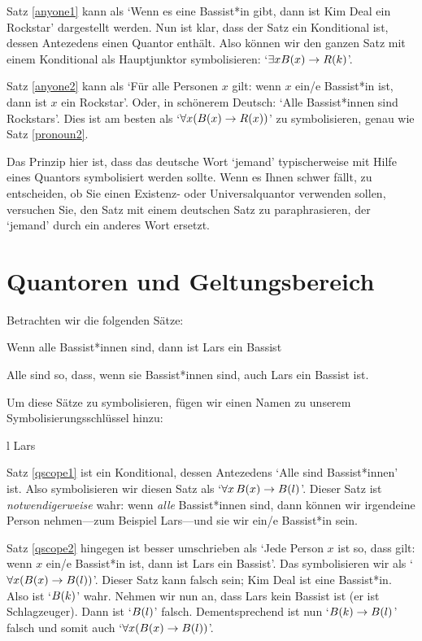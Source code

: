 Satz \ref{anyone1} kann als `Wenn es eine Bassist*in gibt, dann ist Kim Deal ein Rockstar' dargestellt werden. Nun ist klar, dass der Satz ein Konditional ist, dessen Antezedens einen Quantor enthält. Also können wir den ganzen Satz mit einem Konditional als Hauptjunktor symbolisieren: `$\exists x \mathord{B}(x) \rightarrow \mathord{R}(k)$'.

Satz \ref{anyone2} kann als `Für alle Personen $x$ gilt: wenn $x$ ein/e Bassist*in ist, dann ist $x$ ein Rockstar'. Oder, in schönerem Deutsch: `Alle Bassist*innen sind Rockstars'. Dies ist am besten als `$\forall x(\mathord{B}(x) \rightarrow \mathord{R}(x))$' zu symbolisieren, genau wie Satz \ref{pronoun2}.

Das Prinzip hier ist, dass das deutsche Wort `jemand' typischerweise mit Hilfe eines Quantors symbolisiert werden sollte. Wenn es Ihnen schwer fällt, zu entscheiden, ob Sie einen Existenz- oder Universalquantor verwenden sollen, versuchen Sie, den Satz mit einem deutschen Satz zu paraphrasieren, der `jemand' durch ein anderes Wort ersetzt.

\section{Quantoren und Geltungsbereich}
Betrachten wir die folgenden Sätze:
	\begin{earg}
		\item[\ex{qscope1}] Wenn alle Bassist*innen sind, dann ist Lars ein Bassist
		\item[\ex{qscope2}] Alle sind so, dass, wenn sie Bassist*innen sind, auch Lars ein Bassist ist.
	\end{earg}
Um diese Sätze zu symbolisieren, fügen wir einen Namen zu unserem Symbolisierungsschlüssel hinzu:
	\begin{ekey}
		\item[l] Lars
	\end{ekey}
Satz \ref{qscope1} ist ein Konditional, dessen Antezedens `Alle sind Bassist*innen' ist. Also symbolisieren wir diesen Satz als `$\forall x\, \mathord{B}(x) \rightarrow \mathord{B}(l)$'. Dieser Satz ist \emph{notwendigerweise} wahr: wenn \emph{alle} Bassist*innen sind, dann können wir irgendeine Person nehmen---zum Beispiel Lars---und sie wir ein/e Bassist*in sein. 

Satz \ref{qscope2} hingegen ist besser umschrieben als `Jede Person $x$ ist so, dass gilt: wenn $x$ ein/e Bassist*in ist, dann ist Lars ein Bassist'. Das symbolisieren wir als `$\forall x (\mathord{B}(x) \rightarrow \mathord{B}(l))$'. Dieser Satz kann falsch sein; Kim Deal ist eine Bassist*in. Also ist `$\mathord{B}(k)$' wahr. Nehmen wir nun an, dass Lars kein Bassist ist (er ist Schlagzeuger). Dann ist `$\mathord{B}(l)$' falsch. Dementsprechend ist nun `$\mathord{B}(k) \rightarrow \mathord{B}(l)$' falsch und somit auch `$\forall x (\mathord{B}(x) \rightarrow \mathord{B}(l))$'. 

